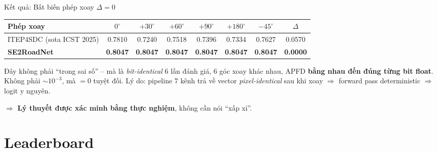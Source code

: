 \documentclass[aspectratio=169,10pt]{beamer}
\begin{document}
\begin{frame}{Kết quả: Bất biến phép xoay $\Delta = 0$}
\vspace{0.4em}
\begin{center}
\small
\begin{tabular}{l c c c c c c c}
\toprule
\textbf{Phép xoay} & $0^\circ$ & $+30^\circ$ & $+60^\circ$ & $+90^\circ$ & $+180^\circ$ & $-45^\circ$ & $\Delta$ \\
\midrule
ITEP4SDC (sota ICST 2025) & 0.7810 & 0.7240 & 0.7518 & 0.7396 & 0.7334 & 0.7627 & \alert{0.0570} \\
\textbf{SE2RoadNet}        & \textbf{0.8047} & \textbf{0.8047} & \textbf{0.8047} & \textbf{0.8047} & \textbf{0.8047} & \textbf{0.8047}
                           & \cellcolor{success!25}\textbf{0.0000} \\
\bottomrule
\end{tabular}
\end{center}

\vspace{0.8em}
\begin{exampleblock}{Đây không phải ``trong sai số'' -- mà là \emph{bit-identical}}
\small
6 lần đánh giá, 6 góc xoay khác nhau, APFD \textbf{bằng nhau đến đúng từng bit float}. Không phải $\sim 10^{-3}$, mà $= 0$ tuyệt đối. Lý do: pipeline 7 kênh trả về vector \emph{pixel-identical} sau khi xoay $\Rightarrow$ forward pass deterministic $\Rightarrow$ logit y nguyên.
\end{exampleblock}

\vspace{0.4em}
\centering\textcolor{accent}{$\Rightarrow$ \textbf{Lý thuyết được xác minh bằng thực nghiệm}, không cần nói ``xấp xỉ''.}
\end{frame}

\section{Leaderboard}
\end{document}

